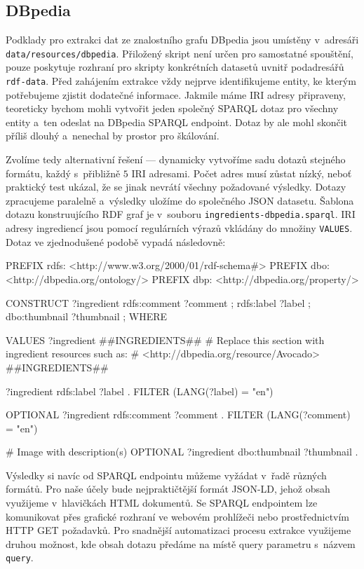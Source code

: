 \subsection{DBpedia}

Podklady pro extrakci dat ze znalostního grafu DBpedia jsou umístěny v~adresáři \texttt{data/resources/dbpedia}. Přiložený skript není určen pro samostatné spouštění, pouze poskytuje rozhraní pro skripty konkrétních datasetů uvnitř podadresářů \texttt{rdf-data}. Před zahájením extrakce vždy nejprve identifikujeme entity, ke kterým potřebujeme zjistit dodatečné informace. Jakmile máme IRI adresy připraveny, teoreticky bychom mohli vytvořit jeden společný SPARQL dotaz pro všechny entity a~ten odeslat na DBpedia SPARQL endpoint. Dotaz by ale mohl skončit příliš dlouhý a~nenechal by prostor pro škálování.

Zvolíme tedy alternativní řešení --- dynamicky vytvoříme sadu dotazů stejného formátu, každý s~přibližně $5$ IRI adresami. Počet adres musí zůstat nízký, neboť praktický test ukázal, že se jinak nevrátí všechny požadované výsledky. Dotazy zpracujeme paralelně a~výsledky uložíme do společného JSON datasetu. Šablona dotazu konstruujícího RDF graf je v~souboru \texttt{ingredients-dbpedia.sparql}. IRI adresy ingrediencí jsou pomocí regulárních výrazů vkládány do množiny \texttt{VALUES}. Dotaz ve zjednodušené podobě vypadá následovně:

\begin{code}
PREFIX rdfs: <http://www.w3.org/2000/01/rdf-schema#>
PREFIX dbo: <http://dbpedia.org/ontology/>
PREFIX dbp: <http://dbpedia.org/property/>

CONSTRUCT {
    ?ingredient rdfs:comment ?comment ;
                rdfs:label ?label ;
                dbo:thumbnail ?thumbnail ;
}
WHERE {
    VALUES ?ingredient { 
        ##INGREDIENTS## 
        # Replace this section with ingredient resources such as:
        # <http://dbpedia.org/resource/Avocado>
        ##INGREDIENTS##
    }

    ?ingredient rdfs:label ?label .
    FILTER (LANG(?label) = "en")
    
    OPTIONAL {
        ?ingredient rdfs:comment ?comment .
        FILTER (LANG(?comment) = "en")
    }

    # Image with description(s)
    OPTIONAL {?ingredient dbo:thumbnail ?thumbnail .}
}
\end{code}

Výsledky si navíc od SPARQL endpointu můžeme vyžádat v~řadě různých formátů. Pro naše účely bude nejpraktičtější formát JSON-LD, jehož obsah využijeme v~hlavičkách HTML dokumentů. Se SPARQL endpointem lze komunikovat přes grafické rozhraní ve webovém prohlížeči nebo prostřednictvím HTTP GET požadavků. Pro snadnější automatizaci procesu extrakce využijeme druhou možnost, kde obsah dotazu předáme na místě query parametru s~názvem \texttt{query}. 

